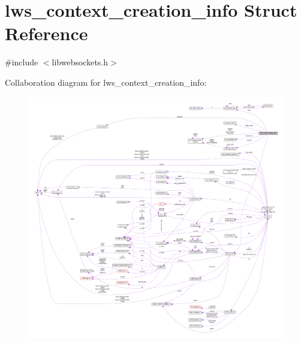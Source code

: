 \hypertarget{structlws__context__creation__info}{}\section{lws\+\_\+context\+\_\+creation\+\_\+info Struct Reference}
\label{structlws__context__creation__info}


{\ttfamily \#include $<$libwebsockets.\+h$>$}



Collaboration diagram for lws\+\_\+context\+\_\+creation\+\_\+info\+:
\nopagebreak
\begin{figure}[H]
\begin{center}
\leavevmode
\includegraphics[width=350pt]{structlws__context__creation__info__coll__graph}
\end{center}
\end{figure}
